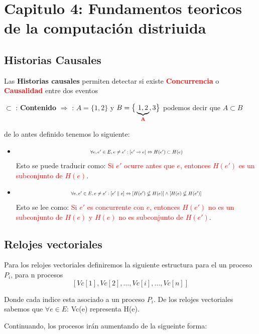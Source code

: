 \section{Capitulo 4: Fundamentos teoricos de la computación distriuida}
\subsection{Historias Causales}
Las \textbf{Historias causales} permiten detectar si existe \textcolor{red}{\textbf{Concurrencia}} o \textcolor{red}{\textbf{Causalidad}} entre dos eventos

{
\noindent\centering
$\subset$ : \textbf{Contenido} $\Rightarrow$ : $A=\{1,2\}$ y 
$B=\big\{\underbrace{1,2}_{\textcolor{red}{\textbf{A}}},3\big\}$ podemos decir que $A \subset B$
\par
}

de lo antes definido tenemos lo siguiente:

\begin{itemize}

    \item 
    \[
    \scalebox{0.70}{$\forall e, e' \in E, e \neq e' : [e' \rightarrow e] \Leftrightarrow H(e') \subset H(e)$}
    \]
    Esto se puede traducir como: \textcolor{red}{Si $e'$ ocurre antes que $e$, entonces $H(e')$ es un subconjunto de $H(e)$}.

    \item 
    \[
    \scalebox{0.70}{$\forall e, e' \in E, e \neq e' : [e' \parallel e] \Leftrightarrow [H(e') \nsubseteq H(e)] \land [H(e) \nsubseteq H(e') ]$}
    \]
    Esto se lee como: \textcolor{red}{Si $e'$ es concurrente con $e$, entonces $H(e')$ no es un subconjunto de $H(e)$ y $H(e)$ no es subconjunto de $H(e')$}.

\end{itemize}


\subsection{Relojes vectoriales}
Para los relojes vectoriales definiremos la siguiente estructura para el un proceso $P_i$, para n procesos
\[
   \left[ \mathit{Vc}[1], \mathit{Vc}[2], \dots, \mathit{Vc}[i], \dots, \mathit{Vc}[n] \right]
\]

Donde cada indice esta asociado a un proceso $P_i$. De los relojes vectoriales sabemos que $\forall e \in E$: Vc(e) representa H(e).

Continuando, los procesos irán aumentando de la sigueinte forma:

